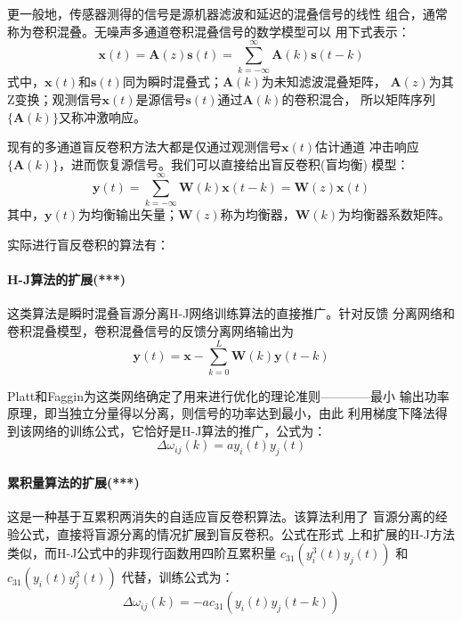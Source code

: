     更一般地，传感器测得的信号是源机器滤波和延迟的混叠信号的线性
组合，通常称为卷积混叠。无噪声多通道卷积混叠信号的数学模型可以
用下式表示：
\begin{equation} 
\bm{x}(t)=\bm{A}(z)\bm{s}(t) = 
\sum^\infty_{k=-\infty}\bm{A}(k)\bm{s}(t-k)
\end{equation}
式中，$\bm{x}(t)$和$\bm{s}(t)$同为瞬时混叠式；$\bm{A}(k)$为未知滤波混叠矩阵，
$\bm{A}(z)$为其Z变换；观测信号$\bm{x}(t)$是源信号$\bm{s}(t)$通过$\bm{A}(k)$的卷积混合，
所以矩阵序列$\{\bm{A}(k)\}$又称冲激响应。
    
	现有的多通道盲反卷积方法大都是仅通过观测信号$\bm{x}(t)$估计通道
冲击响应$\{\bm{A}(k)\}$，进而恢复源信号。我们可以直接给出盲反卷积(盲均衡)
模型：
\begin{equation}
\bm{y}(t) = \sum^\infty_{k=-\infty}\bm{W}(k)\bm{x}(t-k)=\bm{W}(z)\bm{x}(t)
\end{equation}
其中，$\bm{y}(t)$为均衡输出矢量；$\bm{W}(z)$称为均衡器，$\bm{W}(k)$为均衡器系数矩阵。

实际进行盲反卷积的算法有：
\paragraph*{H-J算法的扩展(***)}
这类算法是瞬时混叠盲源分离H-J网络训练算法的直接推广。针对反馈
分离网络和卷积混叠模型，卷积混叠信号的反馈分离网络输出为
\begin{equation}
\bm{y}(t)=\bm{x}-\sum^{L}_{k=0}\bm{W}(k)\bm{y}(t-k)
\end{equation}

Platt和Faggin为这类网络确定了用来进行优化的理论准则————最小
输出功率原理，即当独立分量得以分离，则信号的功率达到最小，由此
利用梯度下降法得到该网络的训练公式，它恰好是H-J算法的推广，公式为：
\begin{equation}
\Delta\omega_{ij}(k)=a y_i(t)y_j(t)
\end{equation}
\paragraph*{累积量算法的扩展(***)}
这是一种基于互累积两消失的自适应盲反卷积算法。该算法利用了
盲源分离的经验公式，直接将盲源分离的情况扩展到盲反卷积。公式在形式
上和扩展的H-J方法类似，而H-J公式中的非现行函数用四阶互累积量
$c_{31}(y_i^3(t)y_j(t))$ 和 $c_{31}(y_i(t)y_j^3(t))$
代替，训练公式为：
\begin{equation}
\Delta\omega_{ij}(k)=-ac_{31}(y_i(t)y_j(t-k))
\end{equation}
